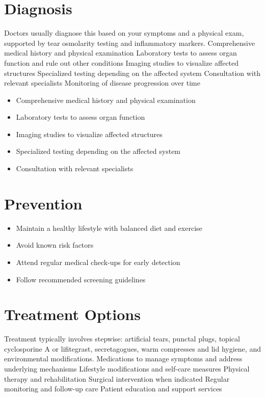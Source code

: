 \section{Diagnosis}
Doctors usually diagnose this based on your symptoms and a physical exam, supported by tear osmolarity testing and inflammatory markers. Comprehensive medical history and physical examination Laboratory tests to assess organ function and rule out other conditions Imaging studies to visualize affected structures Specialized testing depending on the affected system Consultation with relevant specialists Monitoring of disease progression over time

\begin{itemize}[noitemsep]
  \item Comprehensive medical history and physical examination
  \item Laboratory tests to assess organ function
  \item Imaging studies to visualize affected structures
  \item Specialized testing depending on the affected system
  \item Consultation with relevant specialists
\end{itemize}
\section{Prevention}
\begin{itemize}[noitemsep]
  \item Maintain a healthy lifestyle with balanced diet and exercise
  \item Avoid known risk factors
  \item Attend regular medical check-ups for early detection
  \item Follow recommended screening guidelines
\end{itemize}
\section{Treatment Options}
Treatment typically involves stepwise: artificial tears, punctal plugs, topical cyclosporine A or lifitegrast, secretagogues, warm compresses and lid hygiene, and environmental modifications. Medications to manage symptoms and address underlying mechanisms Lifestyle modifications and self-care measures Physical therapy and rehabilitation Surgical intervention when indicated Regular monitoring and follow-up care Patient education and support services

